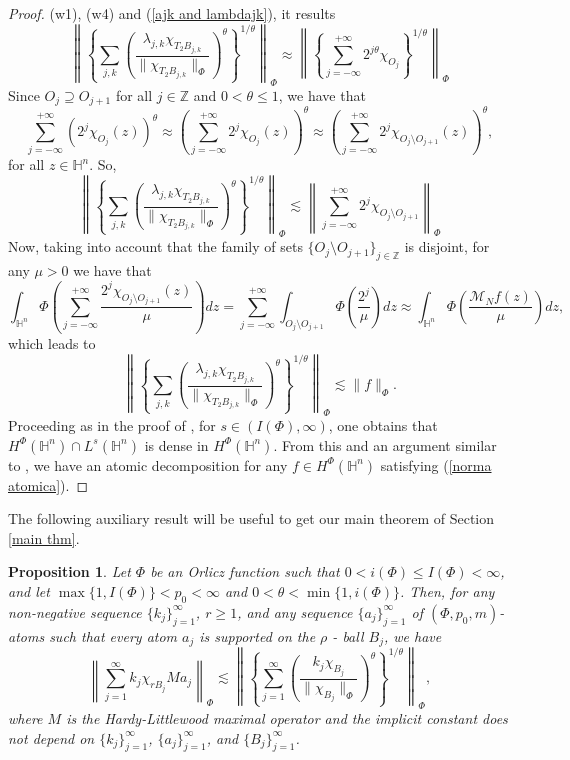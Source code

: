 \documentclass[oneside,10pt]{article}
\newtheorem{proposition}[theorem]{Proposition}
\begin{document}
\begin{proof}
(w1), (w4) and (\ref{ajk and lambdajk}), it results
\[
\left\| \left\{ \sum_{j, k} \left( \frac{\lambda_{j,k} \chi_{T_2 B_{j,k}}}{\| \chi_{T_2 B_{j,k}} \|_{\Phi}} \right)^{\theta} 
\right\}^{1/\theta} \right\|_{\Phi} \approx \left\| \left\{ \sum_{j=-\infty}^{+\infty} 2^{j \theta} \chi_{O_j} \right\}^{1/\theta} 
\right\|_{\Phi}
\]
Since $O_j \supseteq O_{j+1}$ for all $j \in \mathbb{Z}$ and $0 < \theta \leq 1$, we have that
\[
\sum_{j=-\infty}^{+\infty} \left( 2^j \chi_{O_j}(z)  \right)^{\theta} \approx
\left( \sum_{j=-\infty}^{+\infty} 2^j \chi_{O_j}(z) \right)^{\theta} \approx
\left( \sum_{j=-\infty}^{+\infty} 2^j \chi_{O_j \setminus O_{j+1}}(z) \right)^{\theta},
\]
for all $z \in \mathbb{H}^n$. So,
\[
\left\| \left\{ \sum_{j, k} \left( \frac{\lambda_{j,k} \chi_{T_2 B_{j,k}}}{\| \chi_{T_2 B_{j,k}} \|_{\Phi}} \right)^{\theta} 
\right\}^{1/\theta} \right\|_{\Phi} \lesssim
\left\| \sum_{j=-\infty}^{+\infty} 2^j \chi_{O_j \setminus O_{j+1}} \right\|_{\Phi}
\]
Now, taking into account that the family of sets $\{ O_j \setminus O_{j+1} \}_{j \in \mathbb{Z}}$ is disjoint, for any $\mu > 0$ we have that
\[
\int_{\mathbb{H}^n} \Phi\left( \sum_{j=-\infty}^{+\infty} \frac{2^j \chi_{O_j \setminus O_{j+1}}(z)}{\mu} \right) dz =
\sum_{j=-\infty}^{+\infty} \int_{O_j \setminus O_{j+1}} \Phi\left(  \frac{2^j}{\mu} \right) dz \approx
\int_{\mathbb{H}^n} \Phi\left( \frac{\mathcal{M}_N f(z)}{\mu} \right) dz,
\]
which leads to
\[
\left\| \left\{ \sum_{j, k} \left( \frac{\lambda_{j,k} \chi_{T_2 B_{j,k}}}{\| \chi_{T_2 B_{j,k}} \|_{\Phi}} \right)^{\theta} 
\right\}^{1/\theta} \right\|_{\Phi} \lesssim
\| f \|_{\Phi}.
\]
Proceeding as in the proof of \cite[Lemma 4.13]{Nakai}, for $s \in (I(\Phi),\infty)$, one obtains that 
$H^{\Phi}(\mathbb{H}^n) \cap L^{s}(\mathbb{H}^n)$ is dense in $H^{\Phi}(\mathbb{H}^n)$. From this and an argument similar to 
\cite[p. 109]{Elias}, we have an atomic decomposition for any $f \in H^{\Phi}(\mathbb{H}^n)$ satisfying (\ref{norma atomica}).  
\end{proof}

The following auxiliary result will be useful to get our main theorem of Section \ref{main thm}.

\begin{proposition} \label{max on atoms}
Let $\Phi$ be an Orlicz function such that $0 < i(\Phi) \leq I(\Phi) < \infty$, and let
$\max\{ 1, I(\Phi)  \} < p_0 < \infty$ and $0 < \theta < \min\{ 1, i(\Phi) \}$. Then, for any non-negative sequence 
$\{ k_j \}_{j=1}^{\infty}$, $r \geq 1$, and any sequence $\{ a_j \}_{j=1}^{\infty}$ of $(\Phi, p_0, m)$-atoms such that every 
atom $a_j$ is supported on the $\rho$ - ball  $B_j$, we have
\[
\left\| \sum_{j=1}^{\infty} k_j \chi_{r B_j} M a_j \right\|_{\Phi} \lesssim 
\left\| \left\{ \sum_{j=1}^{\infty} \left( \frac{ k_j \chi_{B_j}}{\| \chi_{B_j} \|_{\Phi}} \right)^{\theta} 
\right\}^{1/\theta} \right\|_{\Phi},
\]
where $M$ is the Hardy-Littlewood maximal operator and the implicit constant does not depend on $\{ k_j \}_{j=1}^{\infty}$, 
$\{ a_j \}_{j=1}^{\infty}$, and $\{ B_j \}_{j=1}^{\infty}$.
\end{proposition}
\end{document}
